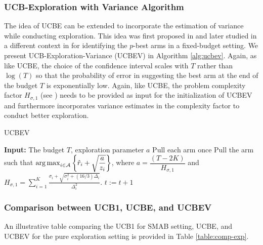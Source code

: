 \subsubsection{UCB-Exploration with Variance Algorithm}

The idea of UCBE can be extended to incorporate the estimation of variance while conducting exploration. This idea was first proposed in \citet{audibert2010best} and later studied in a different context in \citet{gabillon2011multi} for identifying the $p$-best arms in a fixed-budget setting. We present UCB-Exploration-Variance (UCBEV) in Algorithm  \ref{alg:ucbev}. Again, as like UCBE, the choice of the confidence interval scales with $T$ rather than $\log (T)$ so that the probability of error in suggesting the best arm at the end of the budget $T$ is exponentially low. Again, like UCBE, the problem complexity factor $H_{\sigma,1}$ (see \citet{gabillon2011multi}) needs to be provided as input for the initialization of UCBEV and furthermore incorporates variance estimates in the complexity factor to conduct better exploration.


\begin{algorithm}[!ht]
\caption{UCBEV}
\label{alg:ucbev}
\begin{algorithmic}[1]
\State \textbf{Input: } The budget $T$, exploration parameter $a$
\State Pull each arm once
\State Pull the arm such that $\operatorname*{arg\,max}_{i\in \mathcal{A}}\bigg\lbrace\hat{r}_{i} + \sqrt{\dfrac{a}{z_i}}\bigg\rbrace$, where $a = \dfrac{(T-2K)}{H_{\sigma,1}}$ and $H_{\sigma,1}=\sum_{i=1}^{K}\frac{\sigma_{i}+\sqrt{\sigma_{i}^{2}+(16/3)\Delta_{i}}}{\Delta_{i}^{2}}$.
\State $t:=t+1 $
\EndFor
\end{algorithmic}
\end{algorithm}

\subsubsection{Comparison between UCB1, UCBE, and UCBEV}

An illustrative table comparing the UCB1 for SMAB setting, UCBE, and UCBEV for the pure exploration setting is provided in Table \ref{table:comp-exp}.


